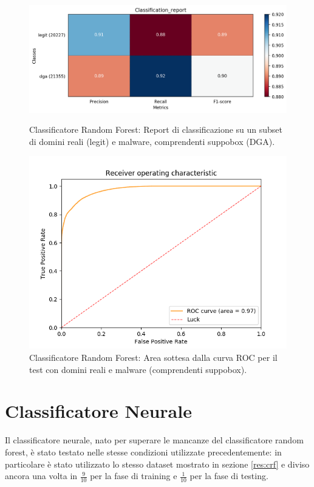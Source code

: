 \begin{figure}[!hb]
    \centering
    \includegraphics[width=.85\columnwidth]{figures/rndf_tra_sup_sup/class_rep.png}
    \caption{Classificatore Random Forest: Report di classificazione su un subset di domini reali (legit) e malware, comprendenti suppobox (DGA).\label{fig:repall}}

    \centering
    \includegraphics[width=.85\columnwidth]{figures/rndf_tra_sup_sup/roc_plot.png}
    \caption{Classificatore Random Forest: Area sottesa dalla curva ROC per il test con domini reali e malware (comprendenti suppobox).\label{fig:rocall}}
\end{figure}

\newpage
\section{Classificatore Neurale}
\label{ris:cnn}
Il classificatore neurale, nato per superare le mancanze del classificatore random forest, è stato testato nelle stesse condizioni utilizzate precedentemente: in particolare è stato utilizzato lo stesso dataset mostrato in sezione \ref{res:crf} e diviso ancora una volta in $\frac{9}{10}$ per la fase di training e $\frac{1}{10}$ per la fase di testing.

